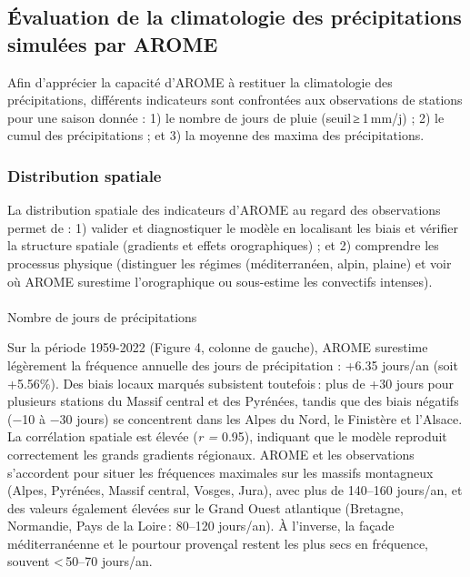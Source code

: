 \documentclass[
  article,
  nofooter,
  noheadings]{jss}
\makeatletter
\let\oldparagraph\paragraph
\renewcommand{\paragraph}{
    \@ifstar
      \xxxParagraphStar
      \xxxParagraphNoStar
  }
\newcommand{\xxxParagraphStar}[1]{\oldparagraph*{#1}\mbox{}}
\newcommand{\xxxParagraphNoStar}[1]{\oldparagraph{#1}\mbox{}}
\makeatother
\begin{document}
\subsection{Évaluation de la climatologie des précipitations simulées
par
AROME}\label{uxe9valuation-de-la-climatologie-des-pruxe9cipitations-simuluxe9es-par-arome}

Afin d'apprécier la capacité d'AROME à restituer la climatologie des
précipitations, différents indicateurs sont confrontées aux observations
de stations pour une saison donnée : 1) le nombre de jours de pluie
(seuil\,≥\,1\,mm/j) ; 2) le cumul des précipitations ; et 3) la moyenne
des maxima des précipitations.

\subsubsection{Distribution spatiale}\label{distribution-spatiale}

La distribution spatiale des indicateurs d'AROME au regard des
observations permet de : 1) valider et diagnostiquer le modèle en
localisant les biais et vérifier la structure spatiale (gradients et
effets orographiques) ; et 2) comprendre les processus physique
(distinguer les régimes (méditerranéen, alpin, plaine) et voir où AROME
surestime l'orographique ou sous-estime les convectifs intenses).

\paragraph{Nombre de jours de
précipitations}\label{nombre-de-jours-de-pruxe9cipitations}

Sur la période 1959-2022 (Figure 4, colonne de gauche), AROME surestime
légèrement la fréquence annuelle des jours de précipitation : +6.35
jours/an (soit +5.56\%). Des biais locaux marqués subsistent
toutefois\,: plus de +30 jours pour plusieurs stations du Massif central
et des Pyrénées, tandis que des biais négatifs (−10 à −30 jours) se
concentrent dans les Alpes du Nord, le Finistère et l'Alsace. La
corrélation spatiale est élevée (\emph{r =} 0.95), indiquant que le
modèle reproduit correctement les grands gradients régionaux. AROME et
les observations s'accordent pour situer les fréquences maximales sur
les massifs montagneux (Alpes, Pyrénées, Massif central, Vosges, Jura),
avec plus de 140--160 jours/an, et des valeurs également élevées sur le
Grand Ouest atlantique (Bretagne, Normandie, Pays de la Loire\,: 80--120
jours/an). À l'inverse, la façade méditerranéenne et le pourtour
provençal restent les plus secs en fréquence, souvent \textless\,50--70
jours/an.
\end{document}
